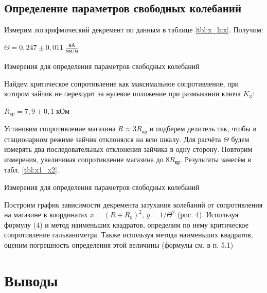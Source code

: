 \documentclass[a4paper,12pt]{article}
\begin{document}
\subsection{Определение параметров свободных колебаний}

  Измерим логарифмический декремент по данным в таблице \ref{tbl:x_lnx}. Получим:
  \begin{center}
    $\boxed{\Theta =  0,247 \pm 0,011 \; \frac{\text{нА}}{\text{мм/м}}}$
  \end{center}

  \begin{table}[h]
    \centering
    
    \caption{Измерения для определения параметров свободных колебаний}
    \label{tbl:x_lnx}
  \end{table}

  Найдем критическое сопротивление как максимальное сопротивление, при котором зайчик не переходит за нулевое положение при размыкании ключа $K_3$:
  \begin{center}
    $\boxed{R_{кр} = 7,9 \pm 0,1 \; \text{кОм}}$
  \end{center}

  Установим сопротивление магазина $R \approx 3R_{кр}$ и подберем делитель так, чтобы в стационарном режиме зайчик отклонялся на всю шкалу. Для расчёта $\Theta$ будем измерять два последовательных отклонения зайчика в одну сторону. Повторим измерения, увеличивая сопротивление магазина до $8R_{кр}$. Результаты занесём в табл. \ref{tbl:x1_x2}.

  \begin{table}[h]
    \centering
    
    \caption{Измерения для определения параметров свободных колебаний}
    \label{tbl:x1_x2}
  \end{table}

  Построим график зависимости декремента затухания колебаний от сопротивления на магазине в координатах $x = (R+R_0)^2$, $y = 1/\Theta^2$ (рис. 4). Используя формулу (4) и метод наименьших квадратов, определим по нему критическое сопротивление гальванометра. Также используя метода наименьших квадратов, оценим погрешность определения этой величины (формулы см. в п. 5.1)

\section{Выводы}
\end{document}
